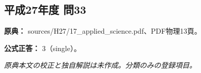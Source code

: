 \subsection{平成27年度 問33}
\label{q:h27-reg-applied-33}

\noindent\textbf{原典：} sources/H27/17\_applied\_science.pdf、PDF物理13頁。

\textbf{公式正答：} 3（single）。

\par\textit{原典本文の校正と独自解説は未作成。分類のみの登録項目。}

